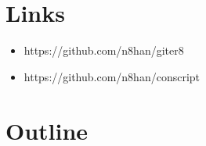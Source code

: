 \documentclass[utf8,utf8x]{beamer}
\begin{document}
\section{Links}
\begin{frame}[fragile]
  \begin{itemize}
    \item https://github.com/n8han/giter8
    \item https://github.com/n8han/conscript
  \end{itemize}
\end{frame}

\section*{Outline}
\frame{\tableofcontents}
\end{document}
